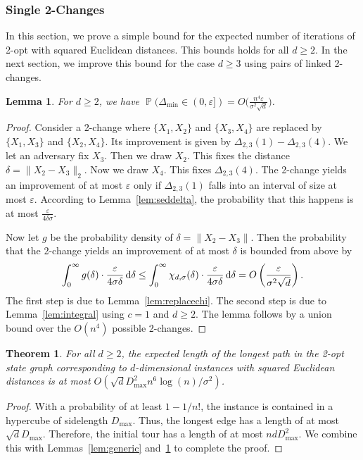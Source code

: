 \documentclass[11pt,DIV=12,a4paper]{scrartcl}
\newtheorem{theorem}[claim]{Theorem}
\newtheorem{lemma}[claim]{Lemma}
\newcommand{\edge}[2]{\ensuremath{\{X_{#1}, X_{#2}\}}}
\newcommand{\eps}{\varepsilon}
\newcommand{\maxx}{D_{\max}}
\newcommand{\dmin}{\Delta_{\min}}
\DeclareMathOperator{\probab}{\mathbb{P}}
\begin{document}
\subsubsection{Single 2-Changes}
\label{ssec:sedsimple}

In this section, we prove a simple bound for the expected number of iterations of 2-opt with squared Euclidean distances.
This bounds holds for all $d \geq 2$. In the next section, we improve this bound for the case $d \geq 3$ using pairs of linked 2-changes.

\begin{lemma}
\label{lem:sedsingle}
For $d \geq 2$, we have $\probab(\dmin \in (0,\eps]) = O\bigl(\frac{n^4 \eps}{\sigma^2\sqrt d}\bigr)$.
\end{lemma}

\begin{proof}
Consider a 2-change where $\edge 12$ and $\edge 34$ are replaced by $\edge 13$ and $\edge 24$.
Its improvement is given by $\Delta_{2,3}(1) - \Delta_{2,3}(4)$.
We let an adversary fix $X_3$. Then we draw $X_2$. This fixes the distance $\delta = \|X_2 - X_3\|_2$.
Now we draw $X_4$. This fixes $\Delta_{2,3}(4)$. The 2-change yields an improvement of at most $\eps$
only if $\Delta_{2,3}(1)$ falls into an interval of size at most $\eps$.
According to Lemma~\ref{lem:seddelta},
the probability that this happens is at most $\frac{\eps}{4\delta \sigma}$.

Now let $g$ be the probability density of $\delta = \|X_2 - X_3\|$.
Then the probability that the 2-change yields an improvement of at most $\delta$ is bounded from above by
\[
\int_{0}^\infty g(\delta) \cdot \frac{\eps}{4 \sigma\delta} \, \textup d \delta 
\leq\int_{0}^\infty \chi_{d, \sigma}(\delta) \cdot \frac{\eps}{4 \sigma\delta} \, \textup d \delta 
= O\left(\frac{\eps}{\sigma^2 \sqrt d}\right).
\]
The first step is due to Lemma~\ref{lem:replacechi}. The second step is due to Lemma~\ref{lem:integral}
using $c=1$ and $d \geq 2$.
The lemma follows by a union bound over the $O(n^4)$ possible 2-changes.
\end{proof}

\begin{theorem}
\label{thm:squaredsingle}
For all $d \geq 2$, the expected length of the longest path in the 2-opt state graph corresponding to $d$-dimensional instances with
squared Euclidean distances is at most $O(\sqrt d \maxx^2 n^6 \log(n) /\sigma^2)$.
\end{theorem}

\begin{proof}
With a probability of at least $1-1/n!$, the instance is contained in a hypercube of sidelength $\maxx$. Thus, the longest
edge has a length of at most $\sqrt d \maxx$. Therefore, the initial tour has a length of at most $n d \maxx^2$.
We combine this with Lemmas~\ref{lem:generic} and~\ref{lem:sedsingle} to complete the proof.
\end{proof}
\end{document}
